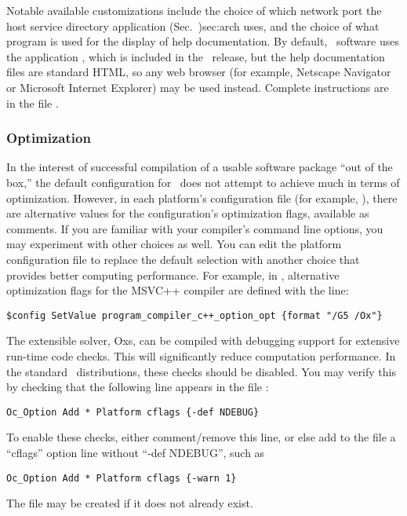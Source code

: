 Notable available customizations include the choice of which network
port the  {host service
directory application (Sec.~}{)}{sec:arch} uses, and the choice of what
program is used for the display of help documentation.  By default, 
\OOMMF\ software uses the application
, which
is included in the \OOMMF\ release, but the help documentation files
are standard HTML, so any web browser (for example, 
Netscape Navigator
or Microsoft Internet Explorer) 
may be used instead.  Complete
instructions are in the file .

\subsubsection{Optimization}\label{sec:optimize}

In the interest of successful compilation of a usable software package
``out of the box,'' the default configuration for \OOMMF\ does not
attempt to achieve much in terms of optimization.  However, in each
platform's configuration file (for example,
), there are alternative values for the
configuration's optimization flags, available as comments.  If you are
familiar with your compiler's command line options, you may experiment
with other choices as well.  You can edit the platform configuration
file to replace the default selection with another choice that
provides better computing performance.  For example, in
, alternative optimization flags for the
MSVC++ compiler are defined with the line:
\begin{verbatim}
$config SetValue program_compiler_c++_option_opt {format "/G5 /Ox"}
\end{verbatim}

The extensible solver, Oxs, can be compiled with debugging support
for extensive run-time code checks.  This will significantly reduce
computation performance.  In the standard \OOMMF\ distributions, these
checks should be disabled.  You may verify this by checking that
the following line appears in the file :
\begin{verbatim}
Oc_Option Add * Platform cflags {-def NDEBUG}
\end{verbatim}
To enable these checks, either comment/remove this line, or else add 
to the  file a ``cflags'' option line
without ``-def NDEBUG'', such as
\begin{verbatim}
Oc_Option Add * Platform cflags {-warn 1}
\end{verbatim}
The  file may be created if it does not
already exist.

